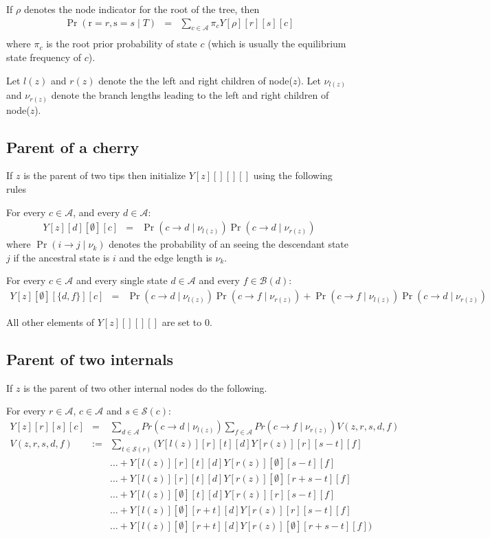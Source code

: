 \documentclass[11pt]{article}
\begin{document}
If $\rho$ denotes the node indicator for the root of the tree, then
\begin{eqnarray*}
\Pr(\mbox{r}=r, \mbox{s}=s\mid T) & = & \sum_{c\in\mathcal{A}} \pi_c Y[\rho][r][s][c]\\
\end{eqnarray*}
where $\pi_c$ is the root prior probability of state $c$ (which is
usually the equilibrium state frequency of $c$).


Let $l(z)$ and $r(z)$ denote the the left and right children of node($z$).
Let $\nu_{l(z)}$ and $\nu_{r(z)}$ denote the  branch lengths leading to the left and right children of node($z$).

\subsection{Parent of a cherry}
If $z$ is the parent of two tips then initialize $Y[z][][][]$ using the following rules

For every $c\in \mathcal{A}$, and every $d\in \mathcal{A}$:
\begin{eqnarray*}
Y[z][d][\emptyset][c] & = & \Pr(c\rightarrow d\mid \nu_{l(z)})\Pr(c\rightarrow d\mid \nu_{r(z)})
\end{eqnarray*}
where  $\Pr(i\rightarrow j\mid \nu_{k})$ denotes the probability of an 
	seeing the descendant state $j$ if the ancestral state is $i$ and 
	the edge length is $\nu_{k}$.


For every $c\in \mathcal{A}$ and every single state $d \in \mathcal{A}$ and
every $f\in \mathcal{B}(d)$:
\begin{eqnarray*}
Y[z][\emptyset][\{d, f\}][c] & = & \Pr(c\rightarrow d\mid \nu_{l(z)})\Pr(c\rightarrow f\mid \nu_{r(z)}) + \Pr(c\rightarrow f\mid \nu_{l(z)})\Pr(c\rightarrow d\mid \nu_{r(z)}) 
\end{eqnarray*}


All other elements of $Y[z][][][]$ are set to 0.

\subsection{Parent of two internals}
If $z$ is the parent of two other internal nodes do the following.

For every $r\in \mathcal{A}$, $c\in \mathcal{A}$ and $s\in\mathcal{S}(c)$:
\begin{eqnarray*}
Y[z][r][s][c] & = & \sum_{d\in \mathcal{A}}Pr(c\rightarrow d\mid \nu_{l(z)})\sum_{f\in \mathcal{A}}Pr(c\rightarrow f\mid \nu_{r(z)}) V(z, r, s, d, f) \\
V(z, r, s, d, f) & := &\sum_{t\in \mathcal{S}(r)}\Bigg(Y[l(z)][r][t][d] Y[r(z)][r][s - t][f]
\\ 
& & \ldots + Y[l(z)][r][t][d] Y[r(z)][\emptyset][s - t][f] \\
& & \ldots + Y[l(z)][r][t][d] Y[r(z)][\emptyset][r + s - t][f]\\
& & \ldots + Y[l(z)][\emptyset][t][d] Y[r(z)][r][s - t][f] \\
& & \ldots + Y[l(z)][\emptyset][r + t][d] Y[r(z)][r][s - t][f]\\
& & \ldots + Y[l(z)][\emptyset][r + t][d] Y[r(z)][\emptyset][r + s - t][f] \Bigg)
\end{eqnarray*}
\end{document}
